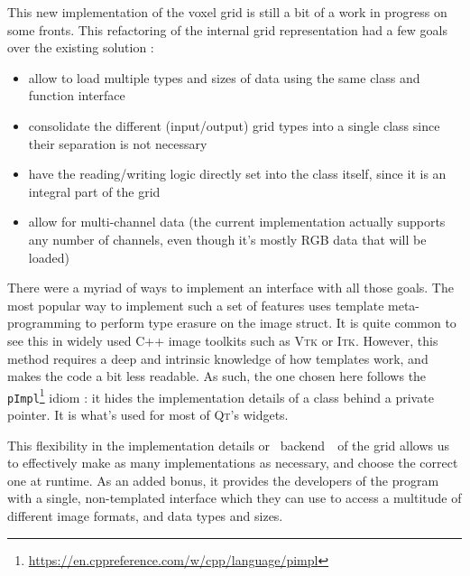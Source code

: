 {{		\vspace{\baselineskip}

		This new implementation of the voxel grid is still a bit of a work in progress on some fronts. This refactoring of the internal grid representation had a few goals over the existing solution :\begin{itemize}
			\item allow to load multiple types and sizes of data using the same class and function interface
			\item consolidate the different (input/output) grid types into a single class since their separation is not necessary
			\item have the reading/writing logic directly set into the class itself, since it is an integral part of the grid
			\item allow for multi-channel data (the current implementation actually supports any number of channels, even though it's mostly RGB data that will be loaded)
		\end{itemize}

		There were a myriad of ways to implement an interface with all those goals. The most popular way to implement such a set of features uses template meta-programming to perform type erasure on the image struct. It is quite common to see this in widely used C++ image toolkits such as \textsc{Vtk} or \textsc{Itk}. However, this method requires a deep and intrinsic knowledge of how templates work, and makes the code a bit less readable. As such, the one chosen here follows the \texttt{pImpl}\footnote{\href{https://en.cppreference.com/w/cpp/language/pimpl}{https://en.cppreference.com/w/cpp/language/pimpl}} idiom : it hides the implementation details of a class behind a private pointer. It is what's used for most of \textsc{Qt}'s widgets. \par

		\myparspace

		This flexibility in the implementation details or \guillemotleft{}~backend~\guillemotright{}~of the grid allows us to effectively make as many implementations as necessary, and choose the correct one at runtime. As an added bonus, it provides the developers of the program with a single, non-templated interface which they can use to access a multitude of different image formats, and data types and sizes.\par

}}

